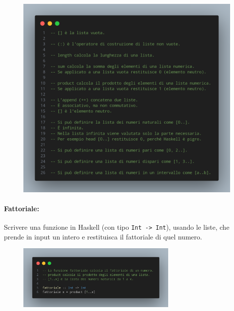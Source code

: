 \begin{figure}[!h]
    \centering
    \includegraphics[width=1\textwidth]{images/Dispensa liste.png}
\end{figure}

\pagebreak

\paragraph{Fattoriale:} Scrivere una funzione in Haskell (con tipo \texttt{Int -> Int}), usando 
le liste, che prende in input un intero e restituisca il fattoriale di quel numero.


\begin{figure}[!h]
    \centering
    \includegraphics[width=0.7\textwidth]{images/Fattoriale.png}
\end{figure}

